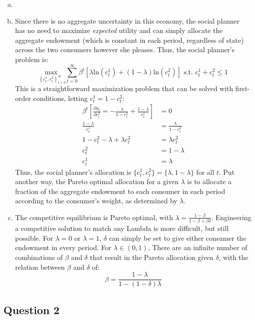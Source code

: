 \documentclass{article}
\newcommand{\loge}[1]{\text{ln}\left(#1\right)}
\newcommand{\usmax}[1]{\underset{#1}{\text{max }}}
\begin{document}
\begin{enumerate}[(a)]
	\item 
	
	
	\item Since there is no aggregate uncertainty in this economy, the social planner has no need to maximize \textit{expected} utility and can simply allocate the aggregate endowment (which is constant in each period, regardless of state) across the two consumers however she pleases. Thus, the social planner's problem is:
		\[
			\usmax{\left\{c^1_t,c^2_t\right\}_{t=0}^\infty}\sum_{t=0}^\infty\beta^t\left[\lambda\loge{c^1_t}+(1-\lambda)\loge{c^2_t}\right]\text{ s.t. } c^1_t + c^2_t\leq 1
		\]
		This is a straightforward maximization problem that can be solved with first-order conditions, letting ${c^1_t=1-c^2_t}$:
		\begin{align*}
			\beta^t\left[\frac{\partial u_t}{\partial c^2_t} = -\frac{\lambda}{1-c^2_t} + \frac{1-\lambda}{c^1_t} \right]&= 0	\\
			\frac{1-\lambda}{c^1_t} &= \frac{\lambda}{1-c^2_t} \\
			1-c^2_t-\lambda+\lambda c^2_t &= \lambda c_t^2 	\\
			c^2_t &= 1-\lambda \\
			c^1_t &= \lambda
		\end{align*}
		Thus, the social planner's allocation is ${\{c^1_t,c^2_t\}=\{\lambda,1-\lambda\}}$ for all $t$. Put another way, the Pareto optimal allocation for a given $\lambda$ is to allocate a fraction of the aggregate endowment to each consumer in each period according to the consumer's weight, as determined by $\lambda$.
	
	\item The competitive equilibrium is Pareto optimal, with ${\lambda = \frac{1-\beta}{1-\beta+\beta\delta}}$. Engineering a competitive solution to match any Lambda is more difficult, but still possible. For ${\lambda=0}$ or ${\lambda=1}$, $\delta$ can simply be set to give either consumer the endowment in every period. For ${\lambda\in(0,1)}$, There are an infinite number of combinations of $\beta$ and $\delta$ that result in the Pareto allocation given $\delta$, with the relation between $\beta$ and $\delta$ of:
	\[
		\beta = \frac{1-\lambda}{1-(1-\delta)\lambda}
	\]
	
	
\end{enumerate}

\subsection*{Question 2}
\end{document}
